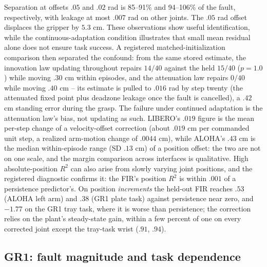 Separation at offsets $.05$ and $.02$ rad is 85--91\% and 94--106\% of the fault,
respectively, with leakage at most $.007$ rad on other joints. The $.05$ rad offset
displaces the gripper by $5.3$ cm. These observations show useful identification, while the
continuous-adaptation condition illustrates that small mean residual alone
does not ensure task success. A registered matched-initialization comparison
then separated the confound: from the same stored estimate, the innovation
law updating throughout repairs $14/40$ against the held $15/40$ ($p=1.0$)
while moving $.30$ cm within episodes, and the attenuation law repairs
$0/40$ while moving $.40$ cm -- its estimate is pulled to $.016$ rad by step
twenty (the attenuated fixed point plus deadzone leakage once the fault is
cancelled), a $.42$ cm standing error during the grasp. The failure under
continued adaptation is the attenuation law's bias, not updating as such. LIBERO's $.019$ figure is the mean per-step change of a velocity-offset
correction (about $.019$ cm per commanded unit step, a realized arm-motion
change of $.0044$ cm), while ALOHA's $.43$ cm is the median within-episode
range (SD $.13$ cm) of a position offset: the two are not on one scale, and
the margin comparison across interfaces is qualitative.
High absolute-position $R^2$ can also arise from slowly varying joint
positions, and the registered diagnostic confirms it: the FIR's position
$R^2$ is within $.001$ of a persistence predictor's. On position
\emph{increments} the held-out FIR reaches $.53$ (ALOHA left arm) and $.38$
(GR1 plate task) against persistence near zero, and $-1.77$ on the GR1 tray
task, where it is worse than persistence; the correction relies on the
plant's steady-state gain, within a few percent of one on every corrected
joint except the tray-task wrist ($.91$, $.94$).

\subsection{GR1: fault magnitude and task dependence}

